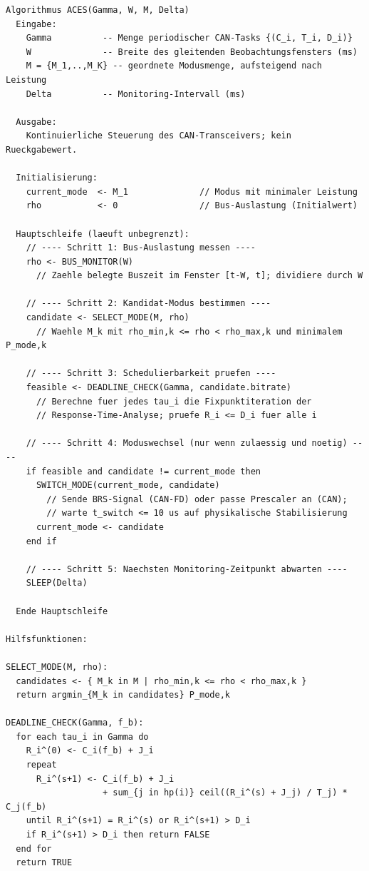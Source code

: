 ﻿\documentclass[a4paper,12pt]{article}
\theoremstyle{definition}
\begin{document}
\begin{lstlisting}[caption={ACES -- Formaler Pseudocode},label=alg:aces]
Algorithmus ACES(Gamma, W, M, Delta)
  Eingabe:
    Gamma          -- Menge periodischer CAN-Tasks {(C_i, T_i, D_i)}
    W              -- Breite des gleitenden Beobachtungsfensters (ms)
    M = {M_1,..,M_K} -- geordnete Modusmenge, aufsteigend nach Leistung
    Delta          -- Monitoring-Intervall (ms)

  Ausgabe:
    Kontinuierliche Steuerung des CAN-Transceivers; kein Rueckgabewert.

  Initialisierung:
    current_mode  <- M_1              // Modus mit minimaler Leistung
    rho           <- 0                // Bus-Auslastung (Initialwert)

  Hauptschleife (laeuft unbegrenzt):
    // ---- Schritt 1: Bus-Auslastung messen ----
    rho <- BUS_MONITOR(W)
      // Zaehle belegte Buszeit im Fenster [t-W, t]; dividiere durch W

    // ---- Schritt 2: Kandidat-Modus bestimmen ----
    candidate <- SELECT_MODE(M, rho)
      // Waehle M_k mit rho_min,k <= rho < rho_max,k und minimalem P_mode,k

    // ---- Schritt 3: Schedulierbarkeit pruefen ----
    feasible <- DEADLINE_CHECK(Gamma, candidate.bitrate)
      // Berechne fuer jedes tau_i die Fixpunktiteration der
      // Response-Time-Analyse; pruefe R_i <= D_i fuer alle i

    // ---- Schritt 4: Moduswechsel (nur wenn zulaessig und noetig) ----
    if feasible and candidate != current_mode then
      SWITCH_MODE(current_mode, candidate)
        // Sende BRS-Signal (CAN-FD) oder passe Prescaler an (CAN);
        // warte t_switch <= 10 us auf physikalische Stabilisierung
      current_mode <- candidate
    end if

    // ---- Schritt 5: Naechsten Monitoring-Zeitpunkt abwarten ----
    SLEEP(Delta)

  Ende Hauptschleife

Hilfsfunktionen:

SELECT_MODE(M, rho):
  candidates <- { M_k in M | rho_min,k <= rho < rho_max,k }
  return argmin_{M_k in candidates} P_mode,k

DEADLINE_CHECK(Gamma, f_b):
  for each tau_i in Gamma do
    R_i^(0) <- C_i(f_b) + J_i
    repeat
      R_i^(s+1) <- C_i(f_b) + J_i
                   + sum_{j in hp(i)} ceil((R_i^(s) + J_j) / T_j) * C_j(f_b)
    until R_i^(s+1) = R_i^(s) or R_i^(s+1) > D_i
    if R_i^(s+1) > D_i then return FALSE
  end for
  return TRUE
\end{lstlisting}
\end{document}
